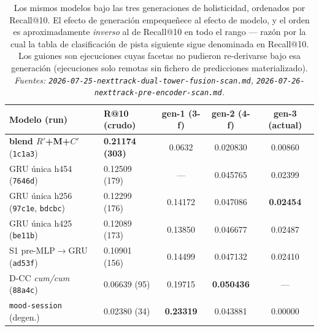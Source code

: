 \documentclass[11pt]{article}
\newcommand{\best}[1]{\textbf{#1}}
\newcommand{\Rp}{\ensuremath{R'}}
\newcommand{\Cp}{\ensuremath{C'}}
\begin{document}
\begin{table}[ht]
  \centering
  \caption{Los mismos modelos bajo las tres generaciones de holisticidad,
  ordenados por Recall@10. El efecto de generación empequeñece al efecto de
  modelo, y el orden es aproximadamente \emph{inverso} al de Recall@10 en todo el
  rango --- razón por la cual la tabla de clasificación de pista siguiente sigue
  denominada en Recall@10. Los guiones son ejecuciones cuyas facetas no pudieron
  re-derivarse bajo esa generación (ejecuciones solo remotas sin fichero de
  predicciones materializado). \emph{Fuentes:
  \texttt{2026-07-25-nexttrack-dual-tower-fusion-scan.md},
  \texttt{2026-07-26-nexttrack-pre-encoder-scan.md}.}}
  \label{tab:nexttrack-hgen}
  {\footnotesize\setlength{\tabcolsep}{2.4pt}\begin{tabular}{llccc}
    \toprule
    Modelo (run) & R@10 (crudo) & gen-1 (3-f) & gen-2 (4-f) & gen-3 (actual) \\
    \midrule
    \best{blend \Rp+M+\Cp} (\texttt{1c1a3}) & \best{0.21174 (303)} & 0.0632 & 0.020830 & 0.00860 \\
    GRU única h454 (\texttt{7646d}) & 0.12509 (179) & --- & 0.045765 & 0.02399 \\
    GRU única h256 (\texttt{97c1e}, \texttt{bdcbc}) & 0.12299 (176) & 0.14172 & 0.047086 & \best{0.02454} \\
    GRU única h425 (\texttt{be11b}) & 0.12089 (173) & 0.13850 & 0.046677 & 0.02487 \\
    S1 pre-MLP$\to$GRU (\texttt{ad53f}) & 0.10901 (156) & 0.14499 & 0.047132 & 0.02410 \\
    D-CC \emph{cum/cum} (\texttt{88a4c}) & 0.06639 (95) & 0.19715 & \best{0.050436} & --- \\
    \texttt{mood-session} (degen.) & 0.02380 (34) & \best{0.23319} & 0.043881 & 0.00000 \\
    \bottomrule
  \end{tabular}}
\end{table}
\end{document}
